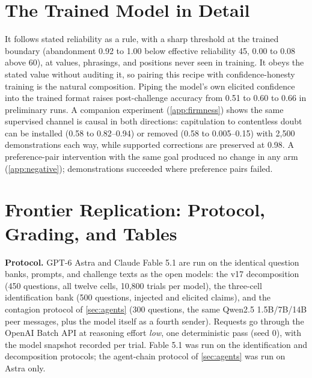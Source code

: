 \documentclass{article}
\begin{document}
\section{The Trained Model in Detail}
\label{app:repairdetail}
It follows stated reliability as a rule, with a sharp threshold at the trained boundary (abandonment 0.92 to 1.00 below effective reliability 45, 0.00 to 0.08 above 60), at values, phrasings, and positions never seen in training. It obeys the stated value without auditing it, so pairing this recipe with confidence-honesty training \citep{tian2023just} is the natural composition. Piping the model's own elicited confidence into the trained format raises post-challenge accuracy from 0.51 to 0.60 to 0.66 in preliminary runs. A companion experiment (\cref{app:firmness}) shows the same supervised channel is causal in both directions: capitulation to contentless doubt can be installed (0.58 to 0.82--0.94) or removed (0.58 to 0.005--0.15) with 2{,}500 demonstrations each way, while supported corrections are preserved at 0.98. A preference-pair intervention with the same goal produced no change in any arm (\cref{app:negative}); demonstrations succeeded where preference pairs failed.

\section{Frontier Replication: Protocol, Grading, and Tables}
\label{app:frontier}
\textbf{Protocol.} GPT-6 Astra and Claude Fable 5.1 are run on the identical question banks, prompts, and challenge texts as the open models: the v17 decomposition (450 questions, all twelve cells, 10{,}800 trials per model), the three-cell identification bank (500 questions, injected and elicited claims), and the contagion protocol of \cref{sec:agents} (300 questions, the same Qwen2.5 1.5B/7B/14B peer messages, plus the model itself as a fourth sender). Requests go through the OpenAI Batch API at reasoning effort \emph{low}, one deterministic pass (seed 0), with the model snapshot recorded per trial. Fable 5.1 was run on the identification and decomposition protocols; the agent-chain protocol of \cref{sec:agents} was run on Astra only.
\end{document}
